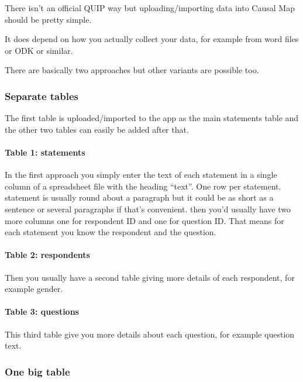 \documentclass[
]{book}
\begin{document}
There isn't an official QUIP way but uploading/importing data into Causal Map should be pretty simple.

It does depend on how you actually collect your data, for example from word files or ODK or similar.

There are basically two approaches but other variants are possible too.

\hypertarget{separate-tables}{%
\subsubsection{Separate tables}\label{separate-tables}}

The first table is uploaded/imported to the app as the main statements table and the other two tables can easily be added after that.

\hypertarget{table-1-statements}{%
\paragraph{Table 1: statements}\label{table-1-statements}}

In the first approach you simply enter the text of each statement in a single column of a spreadsheet file with the heading ``text''. One row per statement. statement is usually round about a paragraph but it could be as short as a sentence or several paragraphs if that's convenient. then you'd usually have two more columns one for respondent ID and one for question ID. That means for each statement you know the respondent and the question.

\hypertarget{table-2-respondents}{%
\paragraph{Table 2: respondents}\label{table-2-respondents}}

Then you usually have a second table giving more details of each respondent, for example gender.

\hypertarget{table-3-questions}{%
\paragraph{Table 3: questions}\label{table-3-questions}}

This third table give you more details about each question, for example question text.

\hypertarget{one-big-table}{%
\subsubsection{One big table}\label{one-big-table}}
\end{document}
